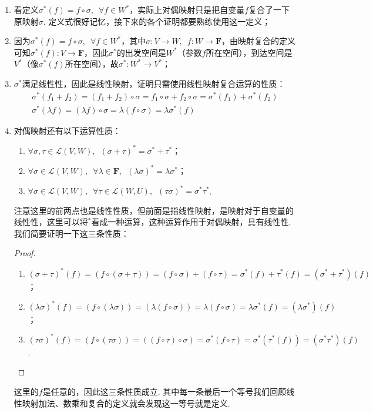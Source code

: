 \begin{enumerate}
    \item 看定义$\sigma^*(f)=f\circ\sigma,\enspace\forall f\in W^*$，实际上对偶映射只是把自变量$f$复合了一下原映射$\sigma$. 定义式很好记忆，接下来的各个证明都要熟练使用这一定义；

    \item 因为$\sigma^*(f)=f\circ\sigma,\enspace\forall f\in W^*$，其中$\sigma:V\to W,\enspace f:W\to\mathbf{F}$，由映射复合的定义可知$\sigma^*(f):V\to\mathbf{F}$，因此$\sigma^*$的出发空间是$W^*$（参数$f$所在空间），到达空间是$V^*$（像$\sigma^*(f)$所在空间），故$\sigma^*:W^*\to V^*$；

    \item $\sigma^*$满足线性性，因此是线性映射，证明只需使用线性映射复合运算的性质：
          \begin{gather*}
              \sigma^*(f_1+f_2)=(f_1+f_2)\circ\sigma=f_1\circ\sigma+f_2\circ\sigma=\sigma^*(f_1)+\sigma^*(f_2) \\
              \sigma^*(\lambda f)=(\lambda f)\circ\sigma=\lambda(f\circ\sigma)=\lambda\sigma^*(f)
          \end{gather*}

    \item 对偶映射还有以下运算性质：
          \begin{enumerate}
              \item $\forall\sigma,\tau\in\mathcal{L}(V,W),\enspace (\sigma+\tau)^*=\sigma^*+\tau^*$；

              \item $\forall\sigma\in\mathcal{L}(V,W),\enspace \forall\lambda\in\mathbf{F},\enspace (\lambda\sigma)^*=\lambda\sigma^*$；

              \item $\forall\sigma\in\mathcal{L}(V,W),\enspace \forall\tau\in\mathcal{L}(W,U),\enspace (\tau\sigma)^*=\sigma^*\tau^*$.
          \end{enumerate}
          注意这里的前两点也是线性性质，但前面是指线性映射，是映射对于自变量的线性性，这里可以将$^*$看成一种运算，这种运算作用于对偶映射，具有线性性. 我们简要证明一下这三条性质：

          \begin{proof}
              \begin{enumerate}
                  \item $(\sigma+\tau)^*(f)=(f\circ(\sigma+\tau))=(f\circ\sigma)+(f\circ\tau)=\sigma^*(f)+\tau^*(f)=(\sigma^*+\tau^*)(f)$；

                  \item $(\lambda\sigma)^*(f)=(f\circ(\lambda\sigma))=(\lambda(f\circ\sigma))=\lambda(f\circ\sigma)=\lambda\sigma^*(f)=(\lambda\sigma^*)(f)$；

                  \item $(\tau\sigma)^*(f)=(f\circ(\tau\sigma))=((f\circ\tau)\circ\sigma)=\sigma^*(f\circ\tau)=\sigma^*(\tau^*(f))=(\sigma^*\tau^*)(f)$.
              \end{enumerate}
          \end{proof}
          这里的$f$是任意的，因此这三条性质成立. 其中每一条最后一个等号我们回顾线性映射加法、数乘和复合的定义就会发现这一等号就是定义.
\end{enumerate}
